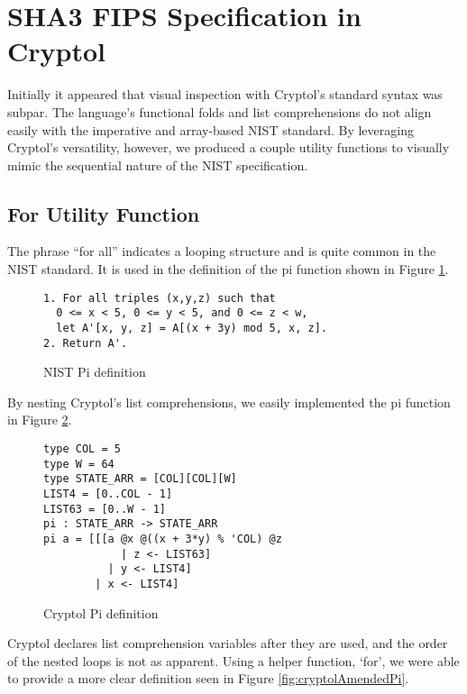 \section{SHA3 FIPS Specification in Cryptol}
\label{sec:fips}
Initially it appeared that visual inspection with Cryptol’s standard syntax was subpar.
The language's functional folds and list comprehensions do not align easily with the imperative 
and array-based NIST standard. By leveraging Cryptol’s versatility, however, we produced a couple 
utility functions to visually mimic the sequential nature of the NIST specification. 

\subsection{For Utility Function}
The phrase “for all” indicates a looping structure and is quite common in the NIST standard. 
It is used in the definition of the pi function shown in Figure \ref{fig:nistPi}.

\begin{figure}[h]
  \centering
  \begin{lstlisting}[basewidth = {.5em},basicstyle={\scriptsize}]
1. For all triples (x,y,z) such that 
  0 <= x < 5, 0 <= y < 5, and 0 <= z < w,
  let A'[x, y, z] = A[(x + 3y) mod 5, x, z].
2. Return A'.
  \end{lstlisting}
  \caption{NIST Pi definition}
  \label{fig:nistPi}
\end{figure}
    
By nesting Cryptol's list comprehensions, we easily implemented the pi function in Figure 
\ref{fig:cryptolPi}. 

\begin{figure}[h]
  \centering
\begin{lstlisting}[language=Cryptol]
type COL = 5 
type W = 64
type STATE_ARR = [COL][COL][W]
LIST4 = [0..COL - 1]
LIST63 = [0..W - 1]
pi : STATE_ARR -> STATE_ARR
pi a = [[[a @x @((x + 3*y) % 'COL) @z 
            | z <- LIST63] 
          | y <- LIST4] 
        | x <- LIST4]
\end{lstlisting}
\caption{Cryptol Pi definition}
\label{fig:cryptolPi}
\end{figure}

Cryptol declares list comprehension variables after they are used, and the order of the
nested loops is not as apparent. Using a helper function, ‘for’, we were able to provide
a more clear definition seen in Figure \ref{fig:cryptolAmendedPi}.

